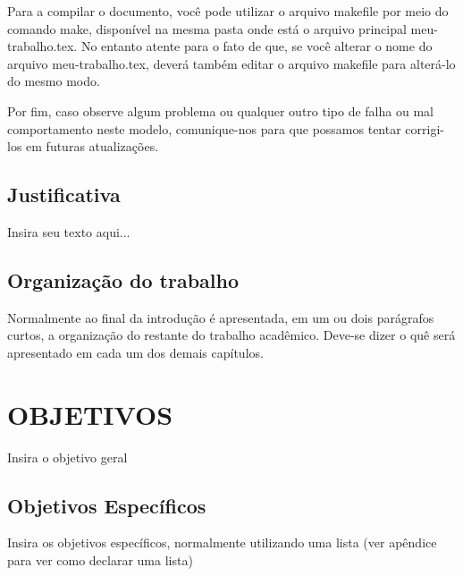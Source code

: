 Para a compilar o documento, você pode utilizar o arquivo {\ttfamily makefile} por meio do comando {\ttfamily make}, disponível na mesma pasta onde está o arquivo principal {\ttfamily meu-\allowbreak trabalho.tex}.
No entanto atente para o fato de que, se você alterar o nome do arquivo {\ttfamily meu-\allowbreak trabalho.tex}, deverá também editar o arquivo {\ttfamily makefile} para alterá-lo do mesmo modo.

Por fim, caso observe algum problema ou qualquer outro tipo de falha ou mal comportamento neste modelo, comunique-nos para que possamos tentar corrigi-los em futuras atualizações.

\section{Justificativa}
\label{sec:justificativa}

Insira seu texto aqui...

\section{Organização do trabalho}
\label{sec:organizacaoTrabalho}

Normalmente ao final da introdução é apresentada, em um ou dois parágrafos curtos, a organização do restante do trabalho acadêmico.
Deve-se dizer o quê será apresentado em cada um dos demais capítulos.

\chapter{OBJETIVOS}
\label{chap:objetivos}

Insira o objetivo geral

\section{Objetivos Específicos}
\label{sec:objetivosespecificos}

Insira os objetivos específicos, normalmente utilizando uma lista (ver apêndice para ver como declarar uma lista)
